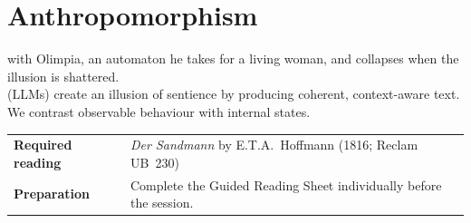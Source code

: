 



\chapter{Anthropomorphism}




 with Olimpia, an automaton he takes for a living
woman, and collapses when the illusion is shattered.\\


 (LLMs) create an illusion of sentience by producing coherent, context-aware text. 
We contrast observable behaviour with internal states.

\vspace{3.5em}

%
\begin{tabular}{p{3.8cm} p{6.5cm}}
    \textbf{Required reading} &
        \textit{Der Sandmann}\index{Der Sandmann}\index{Hoffmann, E. T. A.} by E.T.A.\ Hoffmann
        (1816; Reclam UB~230) \\[3pt]
    \textbf{Preparation}      &
        Complete the Guided Reading Sheet individually before the session. \\
\end{tabular}

